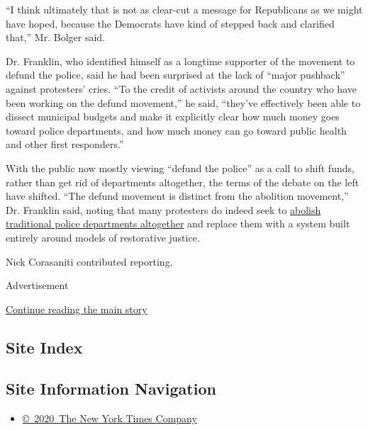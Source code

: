 ``I think ultimately that is not as clear-cut a message for Republicans
as we might have hoped, because the Democrats have kind of stepped back
and clarified that,'' Mr. Bolger said.

Dr. Franklin, who identified himself as a longtime supporter of the
movement to defund the police, said he had been surprised at the lack of
``major pushback'' against protesters' cries. ``To the credit of
activists around the country who have been working on the defund
movement,'' he said, ``they've effectively been able to dissect
municipal budgets and make it explicitly clear how much money goes
toward police departments, and how much money can go toward public
health and other first responders.''

With the public now mostly viewing ``defund the police'' as a call to
shift funds, rather than get rid of departments altogether, the terms of
the debate on the left have shifted. ``The defund movement is distinct
from the abolition movement,'' Dr. Franklin said, noting that many
protesters do indeed seek to
\href{https://www.nytimes.com/2019/04/17/magazine/prison-abolition-ruth-wilson-gilmore.html}{abolish
traditional police departments altogether} and replace them with a
system built entirely around models of restorative justice.

Nick Corasaniti contributed reporting.

Advertisement

\protect\hyperlink{after-bottom}{Continue reading the main story}

\hypertarget{site-index}{%
\subsection{Site Index}\label{site-index}}

\hypertarget{site-information-navigation}{%
\subsection{Site Information
Navigation}\label{site-information-navigation}}

\begin{itemize}
\tightlist
\item
  \href{https://help.nytimes.com/hc/en-us/articles/115014792127-Copyright-notice}{©~2020~The
  New York Times Company}
\end{itemize}

